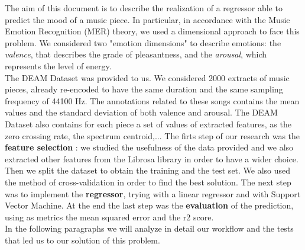 \documentclass[12pt,a4paper]{book}
\begin{document}
	The aim of this document is to describe the realization of a regressor able to predict the mood of a music piece. In particular, in accordance with the Music Emotion Recognition (MER) theory, we used a dimensional approach to face this problem. We considered two "emotion dimensions" to describe emotions: the \textit{valence}, that describes the grade of pleasantness, and the \textit{arousal}, which represents the level of energy.\\
	The DEAM Dataset was provided to us. We considered 2000 extracts of music pieces, already re-encoded to have the same duration and the same sampling frequency of 44100 Hz. The annotations related to these songs contains the mean values and the standard deviation of both valence and arousal. The DEAM Dataset also contains for each piece a set of values of extracted features, as the zero crossing rate, the spectrum centroid,... The firts step of our research was the \textbf{feature selection} : we studied the usefulness of the data provided and we also extracted other features from the Librosa library in order to have a wider choice. Then we split the dataset to obtain the training and the test set. We also used the method of cross-validation in order to find the best solution. The next step was to implement the \textbf{regressor}, trying with a linear regressor and with Support Vector Machine. At the end the last step was the \textbf{evaluation} of the prediction, using as metrics the mean squared error and the r2 score.\\In the following paragraphs we will analyze in detail our workflow and the tests that led us to our solution of this problem.
\end{document}
